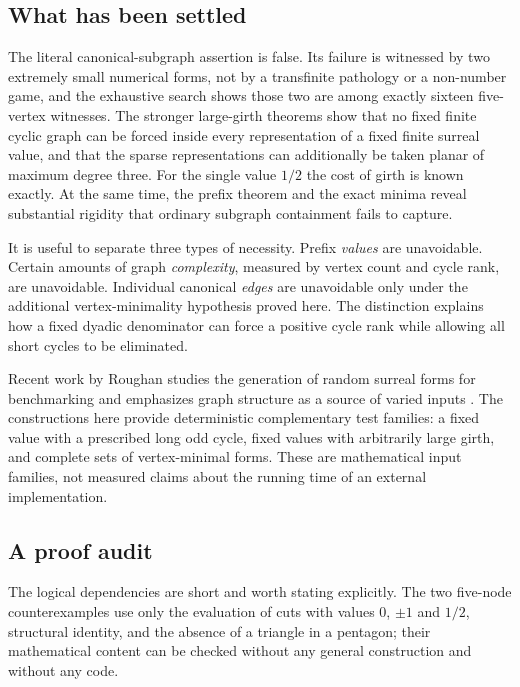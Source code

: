 \documentclass[11pt,a4paper]{article}
\numberwithin{equation}{section}
\theoremstyle{definition}
\theoremstyle{remark}
\begin{document}
\subsection{What has been settled}

The literal canonical-subgraph assertion is false. Its failure is witnessed by
two extremely small numerical forms, not by a transfinite pathology or a
non-number game, and the exhaustive search shows those two are among exactly
sixteen five-vertex witnesses. The stronger large-girth theorems show that no
fixed finite cyclic graph can be forced inside every representation of a fixed
finite surreal value, and that the sparse representations can additionally be
taken planar of maximum degree three. For the single value $1/2$ the cost of
girth is known exactly. At the same time, the prefix theorem and the exact
minima reveal substantial rigidity that ordinary subgraph containment fails to
capture.

It is useful to separate three types of necessity. Prefix \emph{values} are
unavoidable. Certain amounts of graph \emph{complexity}, measured by vertex
count and cycle rank, are unavoidable. Individual canonical \emph{edges} are
unavoidable only under the additional vertex-minimality hypothesis proved
here. The distinction explains how a fixed dyadic denominator can force a
positive cycle rank while allowing all short cycles to be eliminated.

Recent work by Roughan studies the generation of random surreal forms for
benchmarking and emphasizes graph structure as a source of varied inputs
\cite{Roughan2025}. The constructions here provide deterministic complementary
test families: a fixed value with a prescribed long odd cycle, fixed values
with arbitrarily large girth, and complete sets of vertex-minimal forms.
These are mathematical input families, not measured claims about the running
time of an external implementation.

\subsection{A proof audit}

The logical dependencies are short and worth stating explicitly. The two
five-node counterexamples use only the evaluation of cuts with values $0$, $\pm1$
and $1/2$, structural identity, and the absence of a triangle in a pentagon;
their mathematical content can be checked without any general construction and
without any code.
\end{document}
